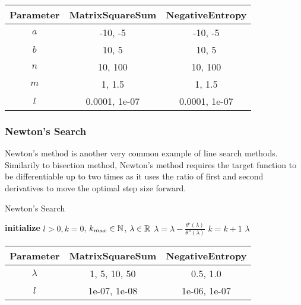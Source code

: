 \documentclass[a4paper,english,titlepage,12pt]{article}
\newcommand{\abs}[1]{\ensuremath|#1|}
\newcommand{\R}{\ensuremath\mathbb{R}}
\newcommand{\N}{\ensuremath\mathbb{N}}
\begin{document}
\begin{center}
\label{tab:params_UniformSearch}
\begin{tabular}{|c|c|c|}
\hline
\rowcolor{gray!25}
Parameter & MatrixSquareSum & NegativeEntropy \\
\hline
$a$ & -10, -5 & -10, -5 \\
$b$ & 10, 5 & 10, 5 \\
$n$ & 10, 100 & 10, 100 \\
$m$ & 1, 1.5 & 1, 1.5 \\
$l$ & 0.0001, 1e-07 & 0.0001, 1e-07 \\
\hline
\end{tabular}
\end{center}


\subsubsection{Newton's Search}


Newton's method is another very common example of line search methods. Similarily to bisection method, Newton's method requires the target function to be differentiable up to two times as it uses the ratio of first and second derivatives to move the optimal step size forward.

\begin{algorithm}[H]
\caption{Newton's Search}
\label{alg_newtons_search}
\begin{algorithmic}[1]
\STATE \textbf{initialize} $l > 0, k = 0$, $k_{max} \in \N$, $\lambda \in \R$
\WHILE{$\abs{\theta'(\lambda)} > l$ \AND $k < k_{max}$}
    \STATE $\lambda = \lambda -\frac{\theta'(\lambda)}{\theta''(\lambda)}$
    \STATE $k = k + 1$
\ENDWHILE
\RETURN $\lambda$
\end{algorithmic}
\end{algorithm}

\begin{center}
\label{tab:params_NewtonsSearch}
\begin{tabular}{|c|c|c|}
\hline
\rowcolor{gray!25}
Parameter & MatrixSquareSum & NegativeEntropy \\
\hline
$\lambda$ & 1, 5, 10, 50 & 0.5, 1.0 \\
$l$ & 1e-07, 1e-08 & 1e-06, 1e-07 \\
\hline
\end{tabular}
\end{center}
\end{document}
